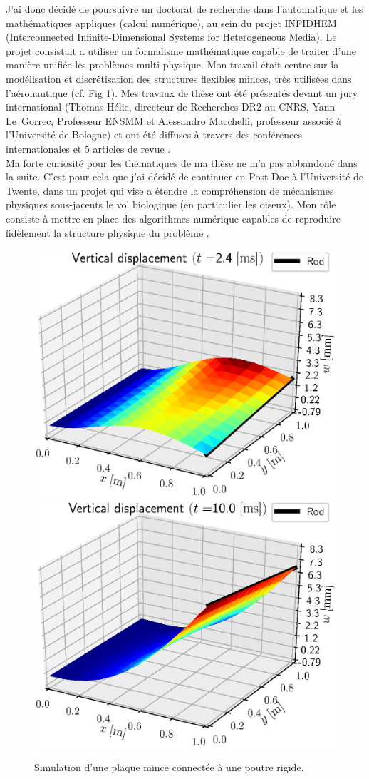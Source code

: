 \documentclass[french]{article}
\begin{document}
J'ai donc décidé de poursuivre un doctorat de recherche dans l'automatique et les mathématiques appliques (calcul numérique), au sein du projet INFIDHEM (Interconnected Infinite-Dimensional Systems for Heterogeneous Media). Le projet consistait a utiliser un formalisme mathématique capable de traiter d'une manière unifiée les problèmes multi-physique. Mon travail était centre sur la modélisation et discrétisation des structures flexibles minces, très utilisées dans l'aéronautique (cf. Fig \ref{fig:IntRod}). Mes travaux de thèse ont été présentés devant un jury international (Thomas Hélie, directeur de Recherches DR2 au CNRS, Yann Le~Gorrec, Professeur ENSMM et Alessandro Macchelli, professeur associé \`a l'Universit\'e de Bologne) et ont été diffuses \`a travers des conférences internationales et 5 articles de revue \cite{brugnoli2019ammmin,brugnoli2019ammkir,brugnoli2020msd,brugnoli2021ther,brugnoli2021num}. \\

Ma forte curiosit\'e pour les thématiques de ma thèse ne m'a pas abbandon\'e dans la suite. C'est pour cela que j'ai décidé de continuer en Post-Doc \`a l'Universit\'e de Twente, dans un projet qui vise a étendre la compréhension de mécanismes physiques sous-jacents le vol biologique (en particulier les oiseux). Mon rôle consiste \`a mettre en place des algorithmes numérique capables de reproduire fidèlement la structure physique du problème \cite{califano2021}.

\begin{figure}[hbt]
	\includegraphics[width=0.5\linewidth]{SnapRod_t25.eps}
	\includegraphics[width=0.5\linewidth]{SnapRod_t100.eps}
	\caption{Simulation d'une plaque mince connectée \`a une poutre rigide.}
	\label{fig:IntRod}
\end{figure}
\end{document}
